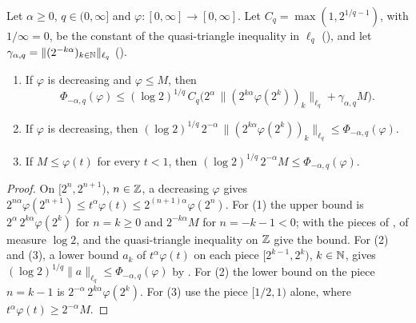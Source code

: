 \begin{lemma}
\label{lem:antitone-phi-functional}
\leanok
{}
Let $\alpha \geq 0$, $q \in (0, \infty]$ and $\varphi : [0, \infty] \to [0, \infty]$. Let
$C_q = \max(1, 2^{1/q - 1})$, with $1/\infty = 0$, be the constant of the quasi-triangle
inequality in $\ell_q$ (), and let
$\gamma_{\alpha, q} = \|(2^{-k\alpha})_{k \in \mathbb{N}}\|_{\ell_q}$ ().
\begin{enumerate}
  \item If $\varphi$ is decreasing and $\varphi \leq M$, then
    \[
      \Phi_{-\alpha, q}(\varphi) \leq (\log 2)^{1/q} \, C_q \bigl(2^\alpha \,
      \|(2^{k\alpha} \varphi(2^k))_k\|_{\ell_q} + \gamma_{\alpha, q} M\bigr) .
    \]
  \item If $\varphi$ is decreasing, then
    $(\log 2)^{1/q} \, 2^{-\alpha} \, \|(2^{k\alpha} \varphi(2^k))_k\|_{\ell_q} \leq
    \Phi_{-\alpha, q}(\varphi)$.
  \item If $M \leq \varphi(t)$ for every $t < 1$, then
    $(\log 2)^{1/q} \, 2^{-\alpha} M \leq \Phi_{-\alpha, q}(\varphi)$.
\end{enumerate}
\end{lemma}

\begin{proof}
\leanok
On $[2^n, 2^{n+1})$, $n \in \mathbb{Z}$, a decreasing $\varphi$ gives
$2^{n\alpha} \varphi(2^{n+1}) \leq t^\alpha \varphi(t) \leq 2^{(n+1)\alpha} \varphi(2^n)$. For
(1) the upper bound is $2^\alpha \, 2^{k\alpha} \varphi(2^k)$ for $n = k \geq 0$ and
$2^{-k\alpha} M$ for $n = -k - 1 < 0$;  with the pieces of
, of measure $\log 2$, and the quasi-triangle inequality on $\mathbb{Z}$ give
the bound. For (2) and (3), a lower bound $a_k$ of $t^\alpha \varphi(t)$ on each piece
$[2^{k-1}, 2^k)$, $k \in \mathbb{N}$, gives $(\log 2)^{1/q} \|a\|_{\ell_q} \leq
\Phi_{-\alpha, q}(\varphi)$ by . For (2) the lower bound on the piece
$n = k - 1$ is $2^{-\alpha} \, 2^{k\alpha} \varphi(2^k)$. For (3) use the piece $[1/2, 1)$
alone, where $t^\alpha \varphi(t) \geq 2^{-\alpha} M$.
\end{proof}


